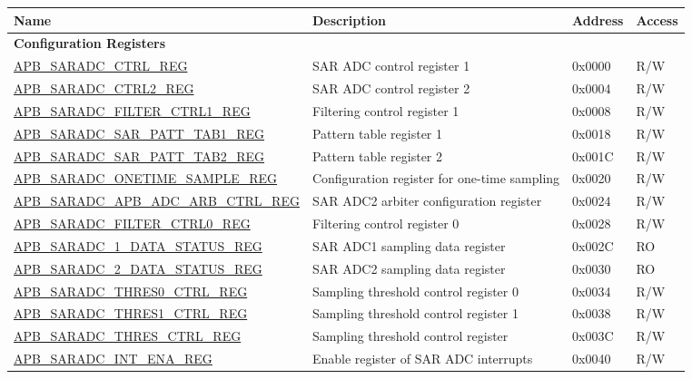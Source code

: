 \begin{longtable}{ | p{7cm} | p{5.2cm} | p{1.3cm} | p{1cm} | }
\hline\rowcolor{lightgray}
Name & Description & Address & Access \\ \hline
\endhead
\multicolumn{4}{|l|}{\textbf{Configuration Registers}} \\ \hline
\hyperref[regdesc:APBSARADCCTRLREG]{APB\_SARADC\_CTRL\_REG} & SAR ADC control register 1 & 0x0000 & R/W \\ \hline
\hyperref[regdesc:APBSARADCCTRL2REG]{APB\_SARADC\_CTRL2\_REG} & SAR ADC control register 2 & 0x0004 & R/W \\ \hline
\hyperref[regdesc:APBSARADCFILTERCTRL1REG]{APB\_SARADC\_FILTER\_CTRL1\_REG} & Filtering control register 1 & 0x0008 & R/W \\ \hline
\hyperref[regdesc:APBSARADCSARPATTTAB1REG]{APB\_SARADC\_SAR\_PATT\_TAB1\_REG} & Pattern table register 1 & 0x0018 & R/W \\ \hline
\hyperref[regdesc:APBSARADCSARPATTTAB2REG]{APB\_SARADC\_SAR\_PATT\_TAB2\_REG} & Pattern table register 2 & 0x001C & R/W \\ \hline
\hyperref[regdesc:APBSARADCONETIMESAMPLEREG]{APB\_SARADC\_ONETIME\_SAMPLE\_REG} & Configuration register for one-time sampling & 0x0020 & R/W \\ \hline
\hyperref[regdesc:APBSARADCARBCTRLREG]{APB\_SARADC\_APB\_ADC\_ARB\_CTRL\_REG} & SAR ADC2 arbiter configuration register & 0x0024 & R/W \\ \hline
\hyperref[regdesc:APBSARADCFILTERCTRL0REG]{APB\_SARADC\_FILTER\_CTRL0\_REG} & Filtering control register 0 & 0x0028 & R/W \\ \hline
\hyperref[regdesc:APBSARADCSAR1DATASTATUSREG]{APB\_SARADC\_1\_DATA\_STATUS\_REG} & SAR ADC1 sampling data register & 0x002C & RO \\ \hline
\hyperref[regdesc:APBSARADCSAR2DATASTATUSREG]{APB\_SARADC\_2\_DATA\_STATUS\_REG} & SAR ADC2 sampling data register & 0x0030 & RO \\ \hline
\hyperref[regdesc:APBSARADCTHRES0CTRLREG]{APB\_SARADC\_THRES0\_CTRL\_REG} & Sampling threshold control register 0 & 0x0034 & R/W \\ \hline
\hyperref[regdesc:APBSARADCTHRES1CTRLREG]{APB\_SARADC\_THRES1\_CTRL\_REG} & Sampling threshold control register 1 & 0x0038 & R/W \\ \hline
\hyperref[regdesc:APBSARADCTHRESCTRLREG]{APB\_SARADC\_THRES\_CTRL\_REG} & Sampling threshold control register & 0x003C & R/W \\ \hline
\hyperref[regdesc:APBSARADCINTENAREG]{APB\_SARADC\_INT\_ENA\_REG} & Enable register of SAR ADC interrupts & 0x0040 & R/W \\ \hline

\end{longtable}
